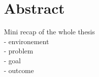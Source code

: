 \chapter{Abstract}

Mini recap of the whole thesis \\
- environement\\
- problem\\
- goal\\
- outcome